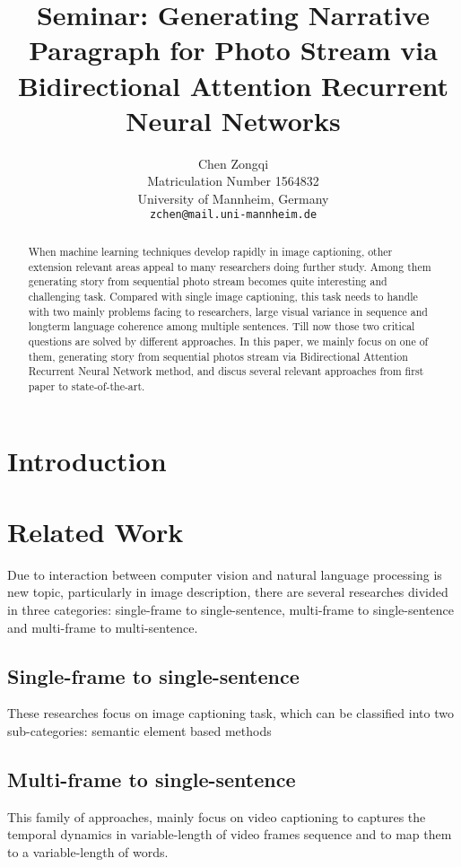 \documentclass[11pt]{article}
\title{Seminar: Generating Narrative Paragraph for Photo Stream via Bidirectional Attention Recurrent Neural Networks}
\author{Chen Zongqi\\
	    Matriculation Number 1564832\\
	    University of Mannheim, Germany\\
	    {\tt zchen@mail.uni-mannheim.de}}
\date{}
\begin{document}
\maketitle

\begin{abstract}
When machine learning techniques develop rapidly in image captioning, other extension relevant areas appeal to many researchers doing further study. Among them generating story from sequential photo stream becomes quite interesting and challenging task. Compared with single image captioning, this task needs to handle with two mainly problems facing to researchers, large visual variance in sequence and longterm language coherence among multiple sentences. Till now those two critical questions are solved by different approaches. In this paper, we mainly focus on one of them, generating story from sequential photos stream via Bidirectional Attention Recurrent Neural Network method, and discus several relevant approaches from first paper to state-of-the-art.   
\end{abstract}

\section{Introduction}
	


\section{Related Work}
	
Due to interaction between computer vision and natural language processing is new topic, particularly in image description, there are several researches divided in three categories: single-frame to single-sentence, multi-frame to single-sentence and multi-frame to multi-sentence.		
		
\subsection{ Single-frame to single-sentence}
These researches focus on image captioning task, which can be classified into two sub-categories: semantic element based methods

\subsection{Multi-frame to single-sentence}
This family of approaches, mainly focus on video captioning to captures the temporal dynamics in variable-length of video frames sequence and to map them to a variable-length of words.		
		
\end{document}
